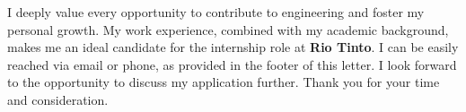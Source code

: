 \documentclass[11pt,a4paper,sans]{moderncv}        %
\newcommand{\companyname}{\textbf{Rio Tinto}}
\begin{document}
I deeply value every opportunity to contribute to engineering and foster my personal growth. 
My work experience, combined with my academic background, makes me an ideal candidate for the internship role at \companyname. 
I can be easily reached via email or phone, as provided in the footer of this letter. 
I look forward to the opportunity to discuss my application further. Thank you for your time and consideration.


\makeletterclosing
\end{document}
